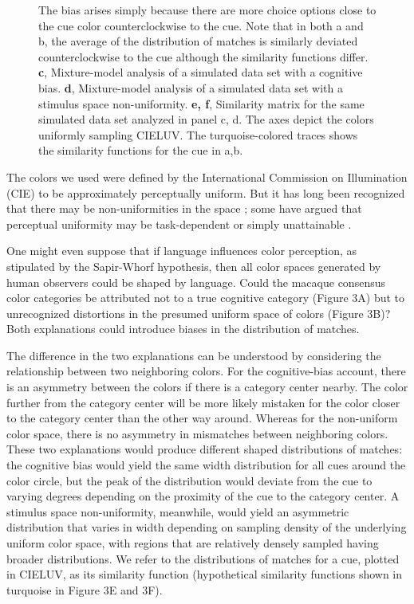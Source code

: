 \begin{figure}
\begin{fullwidth}
{	The bias arises simply because there are more choice options close to the cue color counterclockwise to the cue. 
	Note that in both a and b, the average of the distribution of matches is similarly deviated counterclockwise to the cue although the similarity functions differ. 
	\textbf{c}, Mixture-model analysis of a simulated data set with a cognitive bias. 
	\textbf{d}, Mixture-model analysis of a simulated data set with a stimulus space non-uniformity. 
	\textbf{e, f}, Similarity matrix for the same simulated data set analyzed in panel c, d. The axes depict the colors uniformly sampling CIELUV. The turquoise-colored traces shows the similarity functions for the cue in a,b.}
    \label{fig:TCCDemo}
    \end{fullwidth}
\end{figure}

The colors we used were defined by the International Commission on Illumination (CIE) to be approximately perceptually uniform. 
But it has long been recognized that there may be non-uniformities in the space \citep{stockman_colorimetry_2010}; some have argued that perceptual uniformity may be task-dependent or simply unattainable \citep{judd_ideal_1969}.

One might even suppose that if language influences color perception, as stipulated by the Sapir-Whorf hypothesis, then all color spaces generated by human observers could be shaped by language. 
Could the macaque consensus color categories be attributed not to a true cognitive category (Figure 3A) but to unrecognized distortions in the presumed uniform space of colors (Figure 3B)?
Both explanations could introduce biases in the distribution of matches.

The difference in the two explanations can be understood by considering the relationship between two neighboring colors. 
For the cognitive-bias account, there is an asymmetry between the colors if there is a category center nearby.
The color further from the category center will be more likely mistaken for the color closer to the category center than the other way around. 
Whereas for the non-uniform color space, there is no asymmetry in mismatches between neighboring colors. 
These two explanations would produce different shaped distributions of matches: the cognitive bias would yield the same width distribution for all cues around the color circle, but the peak of the distribution would deviate from the cue to varying degrees depending on the proximity of the cue to the category center. 
A stimulus space non-uniformity, meanwhile, would yield an asymmetric distribution that varies in width depending on sampling density of the underlying uniform color space, with regions that are relatively densely sampled having broader distributions. 
We refer to the distributions of matches for a cue, plotted in CIELUV, as its similarity function (hypothetical similarity functions shown in turquoise in Figure 3E and 3F).


